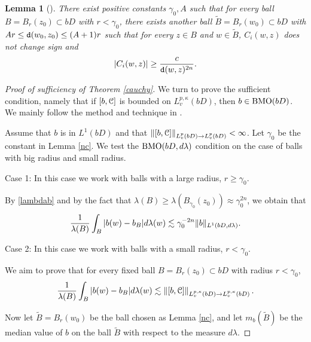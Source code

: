 \documentclass[11pt,a4paper]{amsart}
\numberwithin{equation}{section}
\newtheorem{lemma}[theorem]{Lemma}
\begin{document}
{\begin{lemma}[\cite{DLLWW}]
There exist positive constants $\gamma_0, A$ such that for every ball $B=B_r(z_0)\subset bD$ with $r<\gamma_0$, there exists another ball
$\tilde B = B_r(w_0)\subset bD$ with  $Ar \leq {\tt d}(w_0,z_0) \leq (A+1)r$ such that
for every $z\in B$ and $w\in \tilde B$, $ C_i(w,z)$ does not change sign and $$| C_i(w,z)|\geq { c\over  {\tt d}(w,z)^{2n} }.$$

\end{lemma}




\begin{proof}[Proof of sufficiency of Theorem \ref{cauchy}]

\smallskip


We  turn to prove the sufficient condition, namely that if $[b,\EuScript C]$ is bounded on $L_v^{p,\kappa}(bD)$, then $b\in {\rm BMO}(bD)$. We mainly follow the method and technique in \cite{DLLWW}.

Assume that $b$ is in $L^1(bD)$ and that $\left\|[b,\EuScript C]\right\|_{L_v^p(bD)\to L_v^p(bD)} <\infty$.
Let $\gamma_0$ be the constant in Lemma \ref{nc}. We test the ${\rm BMO}(bD,d\lambda)$ condition on the case of balls with big radius and small radius.

Case 1: In this case we work with balls with a large radius, $r\geq \gamma_0$.

By \eqref{lambdab} and by the fact that
$\lambda(B)\geq \lambda( B_{\gamma_0}(z_0)) \approx \gamma_0^{2n}$, we obtain that
\begin{align*}%
{1\over \lambda(B)} \int_B|b(w)-b_B|d\lambda(w)\lesssim \gamma_0^{-2n} \|b\|_{L^1(bD, d\lambda)}.
\end{align*}

Case 2: In this case we work with balls with a small radius, $r<\gamma_0$.

We aim to prove that for every fixed ball $B=B_r(z_0)\subset bD$ with radius $r<\gamma_0$,
\begin{align*}
{1\over \lambda(B)} \int_B|b(w)-b_B|d\lambda(w)\lesssim \left\|[b,\EuScript C]\right\|_{L_v^{p,\kappa}(bD)\to L_v^{p,\kappa}(bD)}.
\end{align*}


Now let $\tilde B=B_r(w_0)$ be the ball chosen as Lemma \ref{nc}, and let $m_b(\tilde B)$ be the median value of $b$ on the ball $\tilde B$ with respect to the measure $d\lambda$.


\end{proof}}
\end{document}

